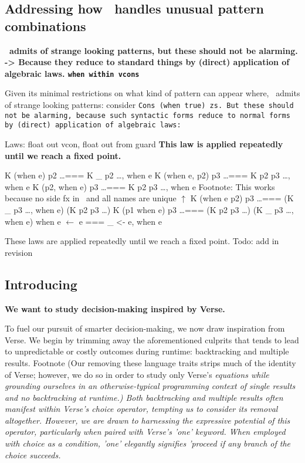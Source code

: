 \documentclass[manuscript,screen,review, 12pt]{acmart}
\begin{document}
\begin{outline}[enumerate]
    
\subsection{Addressing how \PPlus\ handles unusual pattern combinations}
\2 \bf{\PPlus\ admits of strange looking patterns, but these should not be alarming. }
\2 \bf{-> Because they reduce to standard things by (direct) application of algebraic laws. }
\3 \bf{\tt{when} within vcons }

    Given its minimal restrictions on what kind of pattern can appear where,
    \PPlus\ admits of strange looking patterns: consider \tt{Cons (when true)
    zs}. But these should not be alarming, because such syntactic forms reduce
    to normal forms by (direct) application of algebraic laws: 

    
        \3 Laws: float out vcon, float out from guard
        \3 \bf{This law is applied repeatedly until we reach a fixed point.}

        \3 K (when e) p2 \dots === K \_ p2 \dots, when e
        \3 K (when e, p2) p3 \dots  === K p2 p3 \dots, when e
        \3 K (p2, when e) p3 \dots  === K p2 p3 \dots, when e
        \3 Footnote: This works because no side fx in \PPlus\ and all names are unique $\uparrow$ 
        \3 K (when e \pbar p2) p3 \dots === (K \_ p3 \dots, when e) \pbar (K p2 p3 \dots)
        \3 K (p1 \pbar when e) p3 \dots === (K p2 p3 \dots) \pbar (K \_ p3 \dots, when e) 
        \3 when e $\leftarrow$ e === \_ <- e, when e

        
        These laws are applied repeatedly until we reach a fixed point. 
        Todo: add in revision 
\subsection{Introducing \VMinus\ }
\1 \bf{We want to study decision-making inspired by Verse.}
        
        To fuel our pursuit of smarter decision-making, we now draw inspiration
        from Verse. We begin by trimming away the aforementioned culprits that
        tends to lead to unpredictable or costly outcomes during runtime:
        backtracking and multiple results. Footnote (Our removing these language
        traits strips much of the identity of Verse; however, we do so in order
        to study only Verse's \it{equations} while grounding ourselves in an
        otherwise-typical programming context of single results and no
        backtracking at runtime.) Both backtracking and multiple results often
        manifest within Verse's choice operator, tempting us to consider its
        removal altogether. However, we are drawn to harnessing the expressive
        potential of this operator, particularly when paired with Verse's 'one'
        keyword. When employed with choice as a condition, 'one' elegantly
        signifies 'proceed if any branch of the choice succeeds. 
        

\end{outline}
\end{document}
